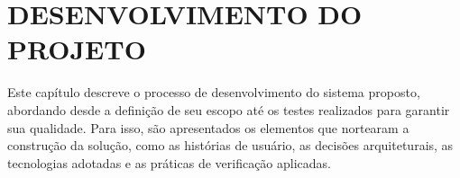 	\chapter{DESENVOLVIMENTO DO PROJETO}

	Este capítulo descreve o processo de desenvolvimento do sistema proposto, abordando desde a definição de seu escopo até os testes realizados para garantir sua qualidade. Para isso, são apresentados os elementos que nortearam a construção da solução, como as histórias de usuário, as decisões arquiteturais, as tecnologias adotadas e as práticas de verificação aplicadas.
	
	
	
	
	
	
	
	
	
	
